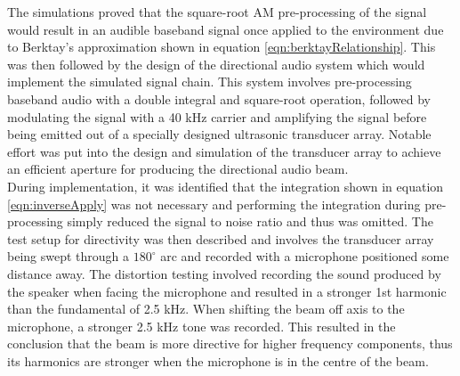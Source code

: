 \documentclass[final,32pt]{beamer}
\begin{document}
\begin{frame}[t]
\begin{multicols}{3}
The simulations proved that the square-root AM pre-processing of the signal would result in an audible baseband signal once applied to the environment due to Berktay's approximation shown in equation \ref{eqn:berktayRelationship}. This was then followed by the design of the directional audio system which would implement the simulated signal chain. This system involves pre-processing baseband audio with a double integral and square-root operation, followed by modulating the signal with a 40 kHz carrier and amplifying the signal before being emitted out of a specially designed ultrasonic transducer array. Notable effort was put into the design and simulation of the transducer array to achieve an efficient aperture for producing the directional audio beam.\\
During implementation, it was identified that the integration shown in equation \ref{eqn:inverseApply} was not necessary and performing the integration during pre-processing simply reduced the signal to noise ratio and thus was omitted. The test setup for directivity was then described and involves the transducer array being swept through a $180^\circ$ arc and recorded with a microphone positioned some distance away. The distortion testing involved recording the sound produced by the speaker when facing the microphone and resulted in a stronger 1st harmonic than the fundamental of 2.5 kHz. When shifting the beam off axis to the microphone, a stronger 2.5 kHz tone was recorded. This resulted in the conclusion that the beam is more directive for higher frequency components, thus its harmonics are stronger when the microphone is in the centre of the beam.

\end{multicols}
\end{frame}
\end{document}
